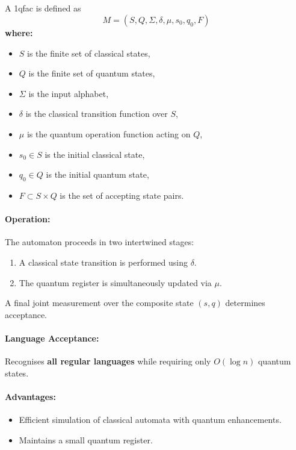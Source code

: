\subsection{}
\label{subsec:1qfac}
\begin{definition}
A \gls{1qfac} is defined as 
\[
M = (S, Q, \Sigma, \delta, \mu, s_0, q_0, F)
\]
\textbf{where:}
\begin{itemize}
    \item \( S \) is the finite set of classical states,
    \item \( Q \) is the finite set of quantum states,
    \item \( \Sigma \) is the input alphabet,
    \item \( \delta \) is the classical transition function over \( S \),
    \item \( \mu \) is the quantum operation function acting on \( Q \),
    \item \( s_0 \in S \) is the initial classical state,
    \item \( q_0 \in Q \) is the initial quantum state,
    \item \( F \subset S \times Q \) is the set of accepting state pairs.
\end{itemize}
\end{definition}

\paragraph{Operation:}  
The automaton proceeds in two intertwined stages:
\begin{enumerate}
    \item A classical state transition is performed using \( \delta \).
    \item The quantum register is simultaneously updated via \( \mu \).
\end{enumerate}
A final joint measurement over the composite state \( (s, q) \) determines acceptance.

\paragraph{Language Acceptance:}  
Recognises \textbf{all regular languages} while requiring only \( O(\log n) \) quantum states.

\paragraph{Advantages:}
\begin{itemize}
    \item Efficient simulation of classical automata with quantum enhancements.
    \item Maintains a small quantum register.
\end{itemize}

